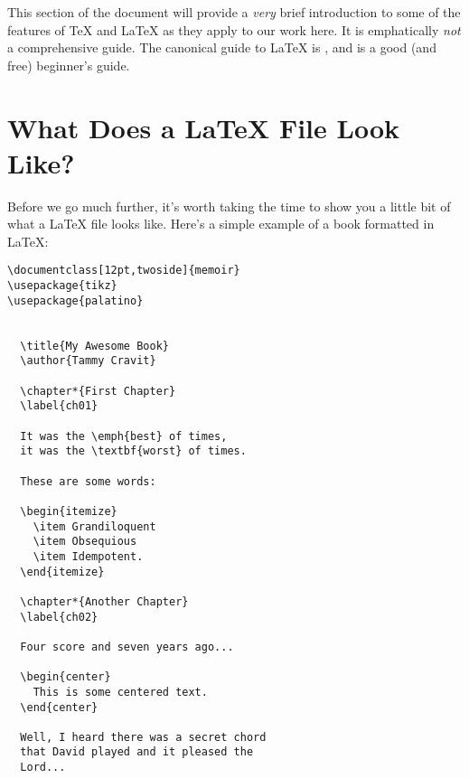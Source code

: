 This section of the document will provide a \emph{very} brief introduction to
some of the features of \TeX{} and \LaTeX{} as they apply to our work here. It is
emphatically \emph{not} a comprehensive guide. The canonical guide to \LaTeX
is \cite{latex2e}, and \cite{lshort} is a good (and free) beginner's guide.

\section{What Does a LaTeX File Look Like?} \label{sec:example}

Before we go much further, it's worth taking the time to show you a little bit
of what a \LaTeX{} file looks like. Here's a simple example of a book formatted
in \LaTeX:

\begin{lstlisting}
\documentclass[12pt,twoside]{memoir}
\usepackage{tikz}
\usepackage{palatino}


  \title{My Awesome Book} 
  \author{Tammy Cravit}
        
  \chapter*{First Chapter} 
  \label{ch01}

  It was the \emph{best} of times, 
  it was the \textbf{worst} of times.

  These are some words:

  \begin{itemize}
    \item Grandiloquent
    \item Obsequious
    \item Idempotent.
  \end{itemize}

  \chapter*{Another Chapter} 
  \label{ch02}

  Four score and seven years ago...

  \begin{center}
    This is some centered text.
  \end{center}

  Well, I heard there was a secret chord 
  that David played and it pleased the
  Lord...

\end{lstlisting}

